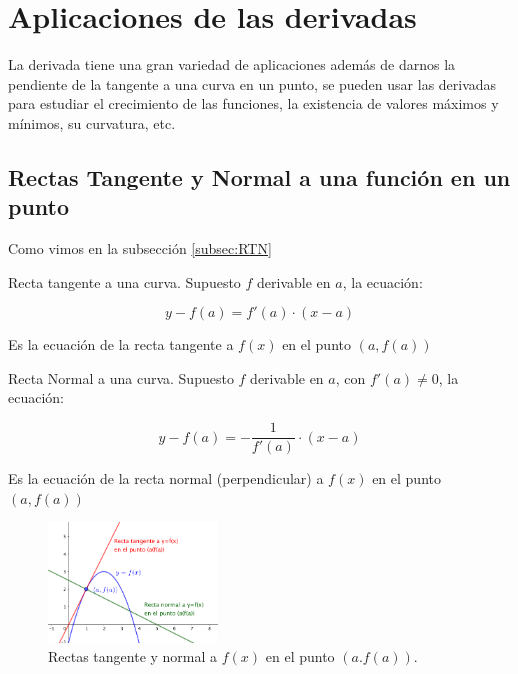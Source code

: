 \chapter{Aplicaciones de las derivadas}	
\label{AplicDeriv}

La derivada tiene una gran variedad de aplicaciones además de darnos la pendiente de la tangente a una curva en un punto, se pueden usar las derivadas para estudiar el crecimiento de las funciones, la existencia de  valores máximos y mínimos, su curvatura, etc.

\section{Rectas Tangente y Normal a una función en un punto}



Como vimos en la subsección \ref{subsec:RTN}

	\begin{multicols}{2}

	\begin{defi}
	Recta tangente a una curva. 
	Supuesto $f$ derivable en $a$, 
	la ecuación:
	  
	 \begin{equation}
	  	\boxed{ \; y-f(a)=f'(a)\cdot(x-a)\; }
	  	\label{eq:recta-tangente}
	  \end{equation}
	  	
	  Es la ecuación de la recta tangente a $f(x)$ en el punto $(a,f(a))$
	 \end{defi}
	  
	 
	 	
	

	 \begin{defi}Recta Normal a una curva. Supuesto $f$ derivable en $a$, con $f'(a)\neq 0$, la ecuación:
	  
	  	\begin{equation}
	  	\boxed{\; y-f(a)=-\dfrac 1 {f'(a)}\cdot(x-a)\;} 
	  	\label{eq:recta-normal}
	  	\end{equation}
	  	
	  	Es la ecuación de la recta normal (perpendicular) a $f(x)$ en el punto $(a,f(a))$
	  \end{defi}

	 \begin{figure}[H]
		\centering
		\includegraphics[width=0.4\textwidth]{imagenes/imagenes05/T05IM01.png}
		\caption {Rectas tangente y normal a $f(x)$ en el punto $(a.f(a))$.}
	\end{figure}
	
	 \end{multicols}
	
